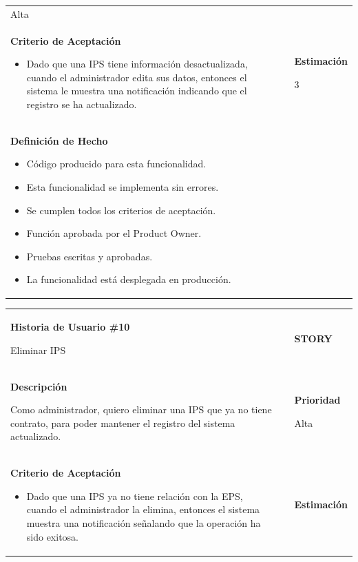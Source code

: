 \documentclass[12pt,a4paper]{article}
\begin{document}
\begin{center}
\begin{tabular}{| p{10cm} c p{2.5cm}|}
Alta\\

\textbf{Criterio de Aceptación}

\begin{itemize}
\item Dado que una IPS tiene información desactualizada, cuando el
administrador edita sus datos, entonces el sistema le muestra
una notificación indicando que el registro se ha actualizado.
\end{itemize} & & \textbf{Estimación}

3 \\ 

\textbf{Definición de Hecho}

\begin{itemize}
\item Código producido para esta funcionalidad.
\item Esta funcionalidad se implementa sin errores.
\item Se cumplen todos los criterios de aceptación.
\item Función aprobada por el Product Owner.
\item Pruebas escritas y aprobadas.
\item La funcionalidad está desplegada en producción.
\end{itemize} & & \\
\hline 
\end{tabular}
\vspace{5mm}

\begin{tabular}{| p{10cm} c p{2.5cm}|}
\hline 
\textbf{Historia de Usuario \#10}

Eliminar IPS & & \textbf{{\Large STORY}} \\ 
\textbf{Descripción}

Como administrador, quiero eliminar una IPS que ya no tiene contrato,
para poder mantener el registro del sistema actualizado. &  & \textbf{Prioridad}

Alta\\

\textbf{Criterio de Aceptación}

\begin{itemize}
\item Dado que una IPS ya no tiene relación con la EPS, cuando el
administrador la elimina, entonces el sistema muestra una
notificación señalando que la operación ha sido exitosa.
\end{itemize} & & \textbf{Estimación}


\end{tabular}
\end{center}
\end{document}
